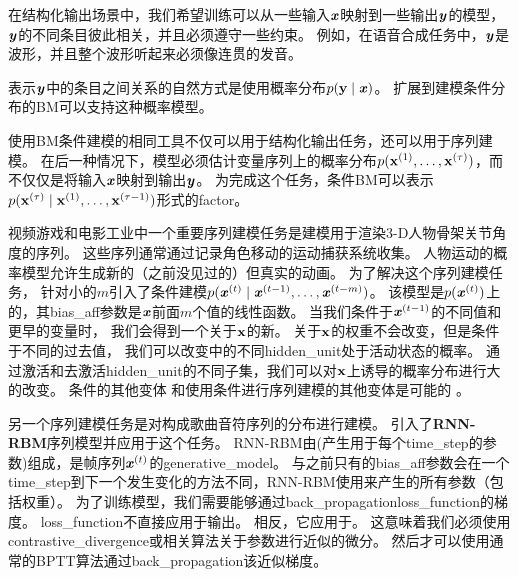 在结构化输出场景中，我们希望训练可以从一些输入$\boldsymbol{\mathit{x}}$映射到一些输出$\boldsymbol{\mathit{y}}$的模型，$\boldsymbol{\mathit{y}}$的不同条目彼此相关，并且必须遵守一些约束。
例如，在语音合成任务中，$\boldsymbol{\mathit{y}}$是波形，并且整个波形听起来必须像连贯的发音。

表示$\boldsymbol{\mathit{y}}$中的条目之间关系的自然方式是使用概率分布$p(\mathbf{y}  \mid  \boldsymbol{\mathit{x}})$。
扩展到建模条件分布的\gls{BM}可以支持这种概率模型。

使用\gls{BM}条件建模的相同工具不仅可以用于结构化输出任务，还可以用于序列建模。 
在后一种情况下，模型必须估计变量序列上的概率分布$p(\mathbf{x}^{(1)}, \dots, \mathbf{x}^{(\tau)})$，而不仅仅是将输入$\boldsymbol{\mathit{x}}$映射到输出$\boldsymbol{\mathit{y}}$。
为完成这个任务，条件\gls{BM}可以表示$p(\mathbf{x}^{(\tau)}  \mid  \mathbf{x}^{(1)}, \dots, \mathbf{x}^{(\tau-1)})$形式的\gls{factor}。

视频游戏和电影工业中一个重要序列建模任务是建模用于渲染3-D人物骨架关节角度的序列。 
这些序列通常通过记录角色移动的运动捕获系统收集。
人物运动的概率模型允许生成新的（之前没见过的）但真实的动画。
为了解决这个序列建模任务，\citet{Taylor+2007} 针对小的$m$引入了条件建模$p(\boldsymbol{\mathit{x}}^{(t)}  \mid  \boldsymbol{\mathit{x}}^{(t-1)}, \dots, \boldsymbol{\mathit{x}}^{(t-m)})$。
该模型是$p(\boldsymbol{\mathit{x}}^{(t)})$上的，其\gls{bias_aff}参数是$\boldsymbol{\mathit{x}}$前面$m$个值的线性函数。
当我们条件于$\boldsymbol{\mathit{x}}^{(t-1)}$的不同值和更早的变量时， 我们会得到一个关于$\mathbf{x}$的新。
关于$\mathbf{x}$的权重不会改变，但是条件于不同的过去值， 我们可以改变中的不同\gls{hidden_unit}处于活动状态的概率。
通过激活和去激活\gls{hidden_unit}的不同子集，我们可以对$\mathbf{x}$上诱导的概率分布进行大的改变。
条件的其他变体 \citep{Mnih-2011} 和使用条件进行序列建模的其他变体是可能的 \citep{TaylorHintonICML2009,SutskeverHintonTaylor2009-small,Boulanger-et-al-ICML2012}。

另一个序列建模任务是对构成歌曲音符序列的分布进行建模。
\citet{Boulanger-et-al-ICML2012} 引入了\textbf{RNN-RBM}序列模型并应用于这个任务。
RNN-RBM由(产生用于每个\gls{time_step}的参数)组成，是帧序列$\boldsymbol{\mathit{x}}^{(t)}$的\gls{generative_model}。
与之前只有的\gls{bias_aff}参数会在一个\gls{time_step}到下一个发生变化的方法不同，RNN-RBM使用来产生的所有参数（包括权重）。
为了训练模型，我们需要能够通过\gls{back_propagation}\gls{loss_function}的梯度。
\gls{loss_function}不直接应用于输出。
相反，它应用于。
这意味着我们必须使用\gls{contrastive_divergence}或相关算法关于参数进行近似的微分。
然后才可以使用通常的\gls{BPTT}算法通过\gls{back_propagation}该近似梯度。



